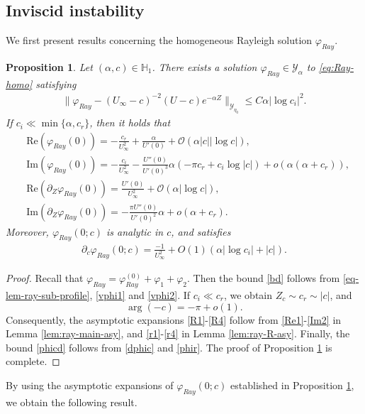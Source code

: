 \documentclass[reqno,11pt]{amsart}
\numberwithin{equation}{section}
\numberwithin{equation}{section}
\theoremstyle{plain}
\newtheorem{proposition}[theorem]{Proposition}
\begin{document}
\subsection{Inviscid instability}
We first present results concerning the homogeneous Rayleigh solution $\varphi_{Ray}$.
	\begin{proposition}\label{prop:ray-homo}
		Let $(\alpha,c)\in \mathbb{H}_1$. There exists a solution $\varphi_{Ray}\in {\mathcal{Y}}_\alpha$ to \eqref{eq:Ray-homo} satisfying
		\begin{align}
			\|\varphi_{Ray}-(U_\infty-c)^{-2}(U-c)e^{-\alpha Z}\|_{\mathcal{Y}_{\eta_0}}\leq C\alpha|\log c_i|^2.\label{bd}
		\end{align}
		If $c_i\ll \min\{\alpha,c_r\}$, then it holds that %
		\begin{align}
			& \mathrm{Re}(\varphi_{Ray}(0))=-\frac{c_r}{U_\infty^2}+\frac{\alpha}{U'(0)}+\mathcal{O}(\alpha|c||\log c|),\label{R1}\\ & \mathrm{Im}(\varphi_{Ray}(0))=-\frac{c_i}{U_\infty^2} -\frac{U''(0)}{U'(0)^3}\alpha (-\pi c_r+c_i\log|c|)+o(\alpha(\alpha+c_r)),\label{R2}\\ & \mathrm{Re}(\partial_Z\varphi_{Ray}(0))=\frac{U'(0)}{U_\infty^2}+\mathcal{O}(\alpha|\log c|),\label{R3}
			\\ & 
			 \mathrm{Im}(\partial_Z\varphi_{Ray}(0))=-\frac{ \pi U''(0)}{U'(0)^2}\alpha+o(\alpha+c_r).\label{R4}
		\end{align}
Moreover, $\varphi_{Ray}(0;c)$ is analytic in $c$, and satisfies
	\begin{align}\label{phicd}
		\partial_c\varphi_{Ray}(0;c)=\frac{-1}{U_{\infty}^2}+O(1)(\alpha|\log c_i|+|c|).
	\end{align}
	\end{proposition}
\begin{proof}
	Recall that $\varphi_{Ray}=\varphi_{Ray}^{(0)}+\varphi_1+\varphi_2$. Then the bound \eqref{bd} follows from \eqref{eq-lem-ray-sub-profile}, \eqref{vphi1} and \eqref{vphi2}. If $c_i\ll c_r$, we obtain $Z_c\sim c_r\sim |c|$, and
	$$\arg(-c)=-\pi+o(1).
	$$
	Consequently, the asymptotic expansions \eqref{R1}-\eqref{R4} follow from \eqref{Re1}-\eqref{Im2} in Lemma \ref{lem:ray-main-asy}, and \eqref{r1}-\eqref{r4} in Lemma \ref{lem:ray-R-asy}. Finally, the bound \eqref{phicd} follows from \eqref{dphic} and \eqref{phir}. The proof of Proposition \ref{prop:ray-homo} is complete.
\end{proof}
By using the asymptotic expansions of $\varphi_{Ray}(0;c)$ established in Proposition \ref{prop:ray-homo}, we obtain the following result.
\end{document}
